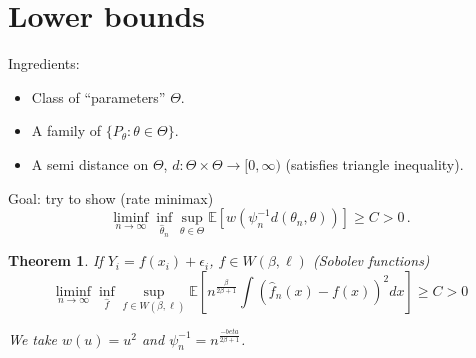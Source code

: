 \documentclass[10pt]{article}
\newcounter{lecnum}
\newtheorem{theorem}{Theorem}[lecnum]
\newcommand{\Expect}[1]{\mathbb{E}\!\left[#1\right]}
\renewcommand{\hat}{\widehat}
\begin{document}
\section{Lower bounds}
Ingredients:
\begin{itemize}
	\item Class of ``parameters'' $\Theta$.
	\item A family of $\{P_{\theta} : \theta \in \Theta\}.$
	\item A semi distance on $\Theta$, $d : \Theta \times \Theta \to [0, \infty)$ (satisfies triangle inequality). 
\end{itemize} 
Goal: try to show (rate minimax)
$$ \liminf\limits_{n \to \infty}\inf\limits_{\hat{\theta}_n}\sup\limits_{\theta \in \Theta}\Expect{w(\psi_n^{-1}d(\theta_n,\theta))} \geq C > 0\,.$$

\begin{theorem}
	If $Y_i=f(x_i)+\epsilon_i$, $f \in W(\beta,\ell)$ (Sobolev functions)
	$$ \liminf\limits_{n \to \infty} \inf\limits_{\hat{f}} \sup\limits_{f \in W(\beta, \ell)}\Expect{n^{\frac{\beta}{2\beta+1}}\int{(\hat{f}_n(x)-f(x))^2dx}}\geq C > 0$$
	
	We take $w(u)=u^2$ and $\psi_n^{-1}=n^\frac{-beta}{2\beta+1}$.
\end{theorem}
\end{document}
